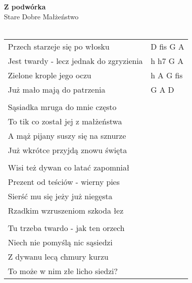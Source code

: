 \documentclass[a5paper]{article}
\begin{document}


\noindent
\fontsize{12pt}{15pt}\selectfont
\textbf{Z podwórka} \\
\fontsize{8pt}{10pt}\selectfont
Stare Dobre Małżeństwo \\ \\
\fontsize{10pt}{12pt}\selectfont
{}
\begin{tabular}{@{}p{6.50cm}p{3cm}@{}}
\noindent
Przech starzeje się po włosku & D fis G A \\
Jest twardy - lecz jednak do zgryzienia & h h7 G A \\
Zielone krople jego oczu & h A G fis \\
Już mało mają do patrzenia & G A D \\ \\

Sąsiadka mruga do mnie często \\
To tik co został jej z małżeństwa \\
A mąż pijany suszy się na sznurze \\
Już wkrótce przyjdą znowu święta \\\\

Wisi też dywan co latać zapomniał \\
Prezent od teściów - wierny pies \\
Sierść mu się jeży już niegęsta \\
Rzadkim wzruszeniom szkoda łez \\\\

Tu trzeba twardo - jak ten orzech \\
Niech nie pomyślą nic sąsiedzi \\
Z dywanu lecą chmury kurzu \\
To może w nim złe licho siedzi?
\end{tabular}
\end{document}
